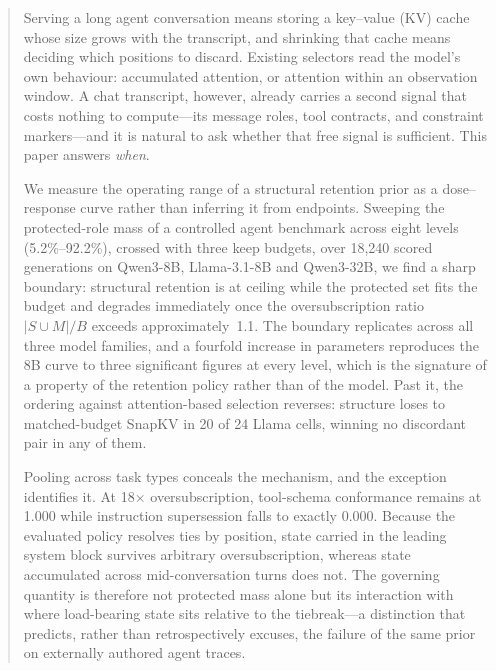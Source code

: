 \maketitle

\begin{abstract}
Serving a long agent conversation means storing a key--value (KV) cache whose
size grows with the transcript, and shrinking that cache means deciding which
positions to discard.  Existing selectors read the model's own behaviour:
accumulated attention, or attention within an observation window.  A chat
transcript, however, already carries a second signal that costs nothing to
compute---its message roles, tool contracts, and constraint markers---and it is
natural to ask whether that free signal is sufficient.  This paper answers
\emph{when}.

We measure the operating range of a structural retention prior as a
dose--response curve rather than inferring it from endpoints.  Sweeping the
protected-role mass of a controlled agent benchmark across eight levels
(5.2\%--92.2\%), crossed with three keep budgets, over 18{,}240 scored
generations on Qwen3-8B, Llama-3.1-8B and Qwen3-32B, we find a sharp boundary: structural
retention is at ceiling while the protected set fits the budget and degrades
immediately once the oversubscription ratio $|S\cup M|/B$ exceeds
approximately~1.1.  The boundary replicates across all three model families, and a
fourfold increase in parameters reproduces the 8B curve to three significant
figures at every level, which is the signature of a property of the retention
policy rather than of the model.  Past
it, the ordering against attention-based selection reverses: structure loses to
matched-budget SnapKV in 20 of 24 Llama cells, winning no discordant pair in any
of them.

Pooling across task types conceals the mechanism, and the exception identifies
it.  At 18$\times$ oversubscription, tool-schema conformance remains at 1.000
while instruction supersession falls to exactly 0.000.  Because the evaluated
policy resolves ties by position, state carried in the leading system block
survives arbitrary oversubscription, whereas state accumulated across
mid-conversation turns does not.  The governing quantity is therefore not
protected mass alone but its interaction with where load-bearing state sits
relative to the tiebreak---a distinction that predicts, rather than
retrospectively excuses, the failure of the same prior on externally authored
agent traces.


\end{abstract}

